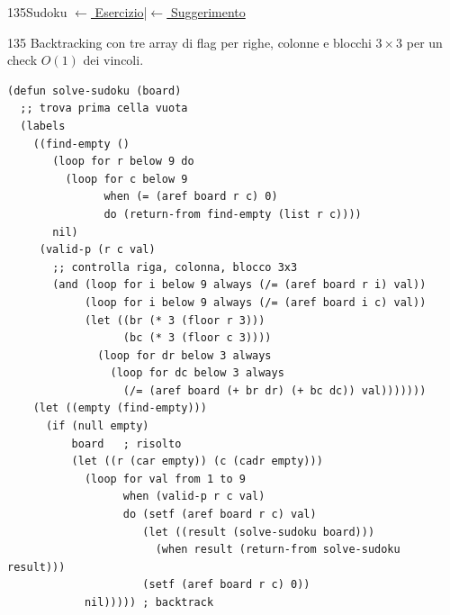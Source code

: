 \label{sol:135}
\begin{solbox}{135}{Sudoku}
\small\color{black!55}\hyperref[ex:135]{$\leftarrow$ Esercizio}\enspace\textcolor{black!30}{|}\enspace\hyperref[hint:135]{$\leftarrow$ Suggerimento}\normalsize\color{black}
\solriferimento
\begin{ragionamentoBox}{135}
Backtracking con tre array di flag per righe, colonne e blocchi
$3\times3$ per un check $O(1)$ dei vincoli.
\end{ragionamentoBox}
\begin{lstlisting}
(defun solve-sudoku (board)
  ;; trova prima cella vuota
  (labels
    ((find-empty ()
       (loop for r below 9 do
         (loop for c below 9
               when (= (aref board r c) 0)
               do (return-from find-empty (list r c))))
       nil)
     (valid-p (r c val)
       ;; controlla riga, colonna, blocco 3x3
       (and (loop for i below 9 always (/= (aref board r i) val))
            (loop for i below 9 always (/= (aref board i c) val))
            (let ((br (* 3 (floor r 3)))
                  (bc (* 3 (floor c 3))))
              (loop for dr below 3 always
                (loop for dc below 3 always
                  (/= (aref board (+ br dr) (+ bc dc)) val)))))))
    (let ((empty (find-empty)))
      (if (null empty)
          board   ; risolto
          (let ((r (car empty)) (c (cadr empty)))
            (loop for val from 1 to 9
                  when (valid-p r c val)
                  do (setf (aref board r c) val)
                     (let ((result (solve-sudoku board)))
                       (when result (return-from solve-sudoku result)))
                     (setf (aref board r c) 0))
            nil))))) ; backtrack
\end{lstlisting}
\end{solbox}

